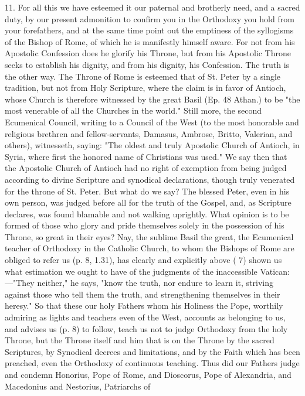 11. For all this we have esteemed it our paternal and brotherly need,
and a sacred duty, by our present admonition to confirm you in the
Orthodoxy you hold from your forefathers, and at the same time point out
the emptiness of the syllogisms of the Bishop of Rome, of which he is
manifestly himself aware. For not from his Apostolic Confession does he
glorify his Throne, but from his Apostolic Throne seeks to establish his
dignity, and from his dignity, his Confession. The truth is the other
way. The Throne of Rome is esteemed that of St. Peter by a single
tradition, but not from Holy Scripture, where the claim is in favor of
Antioch, whose Church is therefore witnessed by the great Basil (Ep. 48
Athan.) to be "the most venerable of all the Churches in the world."
Still more, the second Ecumenical Council, writing to a Council of the
West (to the most honorable and religious brethren and fellow-servants,
Damasus, Ambrose, Britto, Valerian, and others), witnesseth, saying:
"The oldest and truly Apostolic Church of Antioch, in Syria, where first
the honored name of Christians was used." We say then that the Apostolic
Church of Antioch had no right of exemption from being judged according
to divine Scripture and synodical declarations, though truly venerated
for the throne of St. Peter. But what do we say? The blessed Peter, even
in his own person, was judged before all for the truth of the Gospel,
and, as Scripture declares, was found blamable and not walking
uprightly. What opinion is to be formed of those who glory and pride
themselves solely in the possession of his Throne, so great in their
eyes? Nay, the sublime Basil the great, the Ecumenical teacher of
Orthodoxy in the Catholic Church, to whom the Bishops of Rome are
obliged to refer us (p. 8, 1.31), has clearly and explicitly above ( 7)
shown us what estimation we ought to have of the judgments of the
inaccessible Vatican:---"They neither," he says, "know the truth, nor
endure to learn it, striving against those who tell them the truth, and
strengthening themselves in their heresy." So that these our holy
Fathers whom his Holiness the Pope, worthily admiring as lights and
teachers even of the West, accounts as belonging to us, and advises us
(p. 8) to follow, teach us not to judge Orthodoxy from the holy Throne,
but the Throne itself and him that is on the Throne by the sacred
Scriptures, by Synodical decrees and limitations, and by the Faith which
has been preached, even the Orthodoxy of continuous teaching. Thus did
our Fathers judge and condemn Honorius, Pope of Rome, and Dioscorus,
Pope of Alexandria, and Macedonius and Nestorius, Patriarchs of
